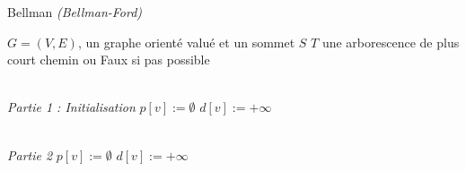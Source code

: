 \documentclass{article}      %
\begin{document}
\begin{algorithm} \caption{Bellman \textit{(Bellman-Ford)}}
\begin{algorithmic}
\Require $G = (V, E)$, un graphe orienté valué et un sommet $S$
\Ensure $T$ une arborescence de plus court chemin ou Faux si pas possible

\\ \State \textit{Partie 1 : Initialisation}
    \State $p[v] := \emptyset$
    \State $d[v] := +\infty$
\EndFor


\\ \State \textit{Partie 2}
    \State $p[v] := \emptyset$
    \State $d[v] := +\infty$
\EndFor
\end{algorithmic}
\end{algorithm}
\end{document}
